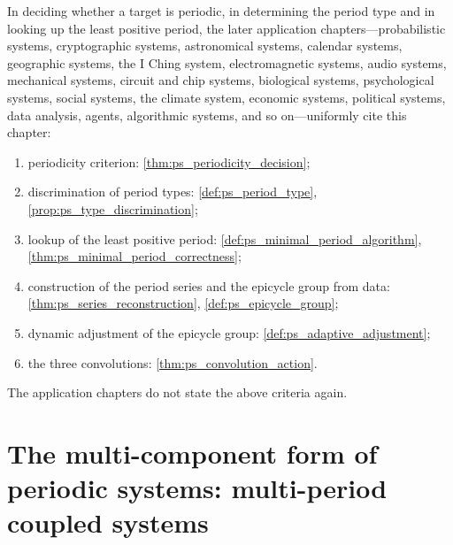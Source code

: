 \begin{remark}\label{rem:ps_applications_hook}
In deciding whether a target is periodic, in determining the period type and in looking up the least positive period, the later application chapters---probabilistic systems, cryptographic systems, astronomical systems, calendar systems, geographic systems, the I Ching system, electromagnetic systems, audio systems, mechanical systems, circuit and chip systems, biological systems, psychological systems, social systems, the climate system, economic systems, political systems, data analysis, agents, algorithmic systems, and so on---uniformly cite this chapter:
\begin{enumerate}[label=(\roman*)]
    \item periodicity criterion: \cref{thm:ps_periodicity_decision};
    \item discrimination of period types: \cref{def:ps_period_type}, \cref{prop:ps_type_discrimination};
    \item lookup of the least positive period: \cref{def:ps_minimal_period_algorithm}, \cref{thm:ps_minimal_period_correctness};
    \item construction of the period series and the epicycle group from data: \cref{thm:ps_series_reconstruction}, \cref{def:ps_epicycle_group};
    \item dynamic adjustment of the epicycle group: \cref{def:ps_adaptive_adjustment};
    \item the three convolutions: \cref{thm:ps_convolution_action}.
\end{enumerate}
The application chapters do not state the above criteria again.
\end{remark}

\section{The multi-component form of periodic systems: multi-period coupled systems}\label{sec:ps_phase_space}

